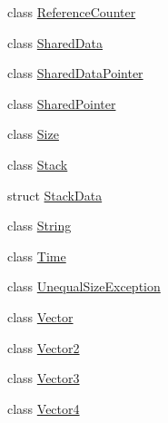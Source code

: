 \begin{DoxyCompactItemize}
\item 
class \hyperlink{classprism_1_1_reference_counter}{Reference\+Counter}
\item 
class \hyperlink{classprism_1_1_shared_data}{Shared\+Data}
\item 
class \hyperlink{classprism_1_1_shared_data_pointer}{Shared\+Data\+Pointer}
\item 
class \hyperlink{classprism_1_1_shared_pointer}{Shared\+Pointer}
\item 
class \hyperlink{classprism_1_1_size}{Size}
\item 
class \hyperlink{classprism_1_1_stack}{Stack}
\item 
struct \hyperlink{structprism_1_1_stack_data}{Stack\+Data}
\item 
class \hyperlink{classprism_1_1_string}{String}
\item 
class \hyperlink{classprism_1_1_time}{Time}
\item 
class \hyperlink{classprism_1_1_unequal_size_exception}{Unequal\+Size\+Exception}
\item 
class \hyperlink{classprism_1_1_vector}{Vector}
\item 
class \hyperlink{classprism_1_1_vector2}{Vector2}
\item 
class \hyperlink{classprism_1_1_vector3}{Vector3}
\item 
class \hyperlink{classprism_1_1_vector4}{Vector4}
\end{DoxyCompactItemize}
